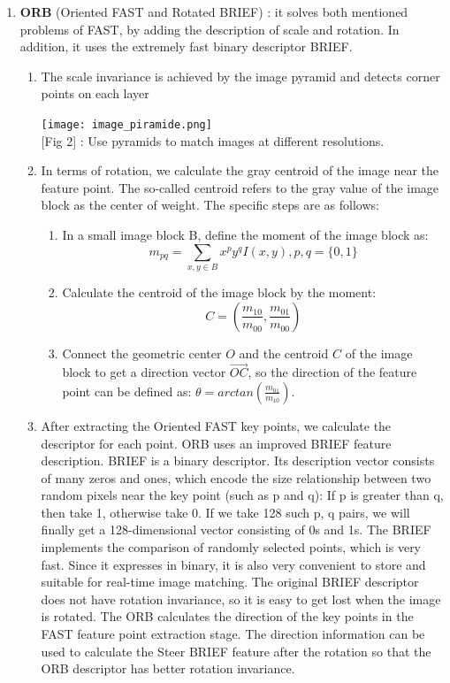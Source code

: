 \begin{enumerate}
    \item {\bf ORB}  (Oriented FAST and Rotated BRIEF) : it solves both mentioned problems of FAST, by adding the description of scale and rotation. In addition, it uses the extremely fast binary descriptor BRIEF.
    \begin{enumerate}
        \item The scale invariance is achieved by the image pyramid and detects corner points on each layer
        \begin{center}
            \texttt{[image: image\_piramide.png]}\\[1cm]
            [Fig 2] : Use pyramids to match images at different resolutions.
        \end{center}
        
        \item In terms of rotation, we calculate the gray centroid of the image near the feature point. The so-called centroid refers to the gray value of the image block as the center of weight. The specific steps are as follows:
        \begin{enumerate}
            \item In a small image block B, define the moment of the image block as:
            $$ m_{pq} = \sum_{x,y \in B} x^p y^q I(x,y), p,q =\{0,1\} $$
            \item Calculate the centroid of the image block by the moment:
            $$ C = (\frac{m_{10}}{m_{00}}, \frac{m_{01}}{m_{00}}) $$
            \item Connect the geometric center $O$ and the centroid $C$ of the image block to get a direction vector $\overrightarrow{OC}$, so the direction of the feature point can be defined as: $\theta = arctan(\frac{m_{01}}{m_{10}})$.
        \end{enumerate}
        
        \item After extracting the Oriented FAST key points, we calculate the descriptor for each point. ORB uses an improved BRIEF feature description. BRIEF is a binary descriptor. Its description vector consists of many zeros and ones, which encode the size relationship between two random pixels near the key point (such as p and q): If p is greater than q, then take 1, otherwise take 0. If we take 128 such p, q pairs, we will finally get a 128-dimensional vector consisting of 0s and 1s. The BRIEF implements the comparison of randomly selected points, which is very fast. Since it expresses in binary, it is also very convenient to store and suitable for real-time image matching. The original BRIEF descriptor does not have rotation invariance, so it is easy to get lost when the image is rotated. The ORB calculates the direction of the key points in the FAST feature point extraction stage. The direction information can be used to calculate the Steer BRIEF feature after the rotation so that the ORB descriptor has better rotation invariance. 
    \end{enumerate}
\end{enumerate}

